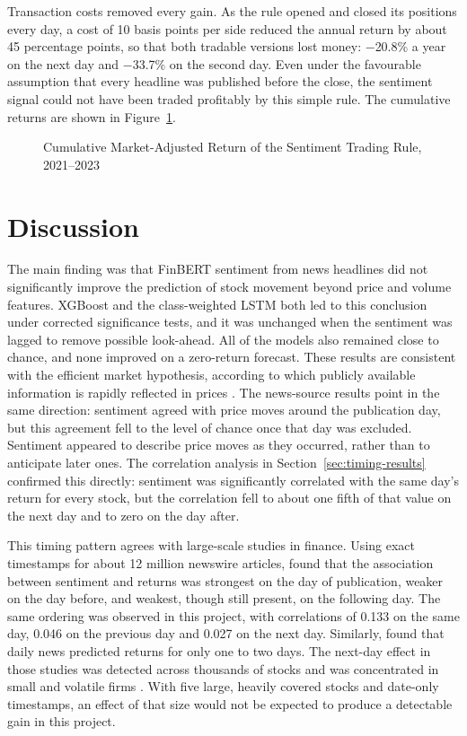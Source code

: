Transaction costs removed every gain. As the rule opened and closed its positions every day, a cost of 10 basis points per side reduced the annual return by about 45 percentage points, so that both tradable versions lost money: $-$20.8\% a year on the next day and $-$33.7\% on the second day. Even under the favourable assumption that every headline was published before the close, the sentiment signal could not have been traded profitably by this simple rule. The cumulative returns are shown in Figure~\ref{fig:trading}.

\begin{figure}[htbp]
\centering
{}
\caption{Cumulative Market-Adjusted Return of the Sentiment Trading Rule, 2021--2023}
\label{fig:trading}
\end{figure}

\section{Discussion}
\label{sec:discussion}
The main finding was that FinBERT sentiment from news headlines did not significantly improve the prediction of stock movement beyond price and volume features. XGBoost and the class-weighted LSTM both led to this conclusion under corrected significance tests, and it was unchanged when the sentiment was lagged to remove possible look-ahead. All of the models also remained close to chance, and none improved on a zero-return forecast. These results are consistent with the efficient market hypothesis, according to which publicly available information is rapidly reflected in prices \parencite{fama1970efficient}. The news-source results point in the same direction: sentiment agreed with price moves around the publication day, but this agreement fell to the level of chance once that day was excluded. Sentiment appeared to describe price moves as they occurred, rather than to anticipate later ones. The correlation analysis in Section~\ref{sec:timing-results} confirmed this directly: sentiment was significantly correlated with the same day's return for every stock, but the correlation fell to about one fifth of that value on the next day and to zero on the day after.

This timing pattern agrees with large-scale studies in finance. Using exact timestamps for about 12 million newswire articles, \textcite{ke2019predicting} found that the association between sentiment and returns was strongest on the day of publication, weaker on the day before, and weakest, though still present, on the following day. The same ordering was observed in this project, with correlations of 0.133 on the same day, 0.046 on the previous day and 0.027 on the next day. Similarly, \textcite{heston2017news} found that daily news predicted returns for only one to two days. The next-day effect in those studies was detected across thousands of stocks and was concentrated in small and volatile firms \parencite{ke2019predicting}. With five large, heavily covered stocks and date-only timestamps, an effect of that size would not be expected to produce a detectable gain in this project.

